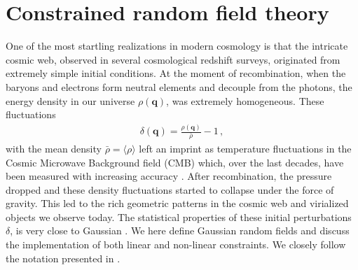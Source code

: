 \documentclass[a4paper, 11pt]{article}
\begin{document}
\section{Constrained random field theory}\label{sec:GRF}
One of the most startling realizations in modern cosmology is that the intricate cosmic web, observed in several cosmological redshift surveys, originated from extremely simple initial conditions. At the moment of recombination, when the baryons and electrons form neutral elements and decouple from the photons, the energy density in our universe $\rho(\bm{q})$, was extremely homogeneous. These fluctuations
\begin{align}
\delta(\bm{q}) = \frac{\rho(\bm{q})}{\bar{\rho}} -1\,,
\end{align}
with the mean density $\bar{\rho} = \langle \rho \rangle$ left an imprint as temperature fluctuations in the Cosmic Microwave Background field (CMB) which, over the last decades, have been measured with increasing accuracy \cite{WMAP:2003, Planck:2016}. After recombination, the pressure dropped and these density fluctuations started to collapse under the force of gravity. This led to the rich geometric patterns in the cosmic web and virialized objects we observe today. The statistical properties of these initial perturbations $\delta$, is very close to Gaussian \cite {Creminelli:2006, Planck:2020}. We here define Gaussian random fields and discuss the implementation of both linear and non-linear constraints. We closely follow the notation presented in \cite{Weygaert:1996}.

\end{document}
